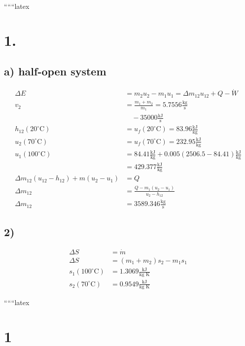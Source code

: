 ``````latex


\section*{1.}

\subsection*{a) half-open system}

\begin{align*}
\Delta E &= m_2 u_2 - m_1 u_1 = \Delta m_{12} u_{12} + Q - \dot{W} \\
v_2 &= \frac{m_1 + m_2}{\dot{m}_1} = 5.7556 \frac{\text{kg}}{\text{s}} \\
&\quad - 35000 \frac{\text{kJ}}{\text{s}} \\
h_{12} (20^\circ \text{C}) &= u_f (20^\circ \text{C}) = 83.96 \frac{\text{kJ}}{\text{kg}} \\
u_2 (70^\circ \text{C}) &= u_f (70^\circ \text{C}) = 232.95 \frac{\text{kJ}}{\text{kg}} \\
u_1 (100^\circ \text{C}) &= 84.41 \frac{\text{kJ}}{\text{kg}} + 0.005 (2506.5 - 84.41) \frac{\text{kJ}}{\text{kg}} \\
&= 429.377 \frac{\text{kJ}}{\text{kg}} \\
\Delta m_{12} (u_{12} - h_{12}) + m (u_2 - u_1) &= Q \\
\Delta m_{12} &= \frac{Q - m_1 (u_2 - u_1)}{u_2 - h_{12}} \\
\Delta m_{12} &= 3589.346 \frac{\text{kg}}{\text{s}}
\end{align*}

\subsection*{2)}

\begin{align*}
\Delta S &= \dot{m} \\
\Delta S &= (m_1 + m_2) s_2 - m_1 s_1 \\
s_1 (100^\circ \text{C}) &= 1.3069 \frac{\text{kJ}}{\text{kg K}} \\
s_2 (70^\circ \text{C}) &= 0.9549 \frac{\text{kJ}}{\text{kg K}}
\end{align*}

``````latex


\section*{1}

